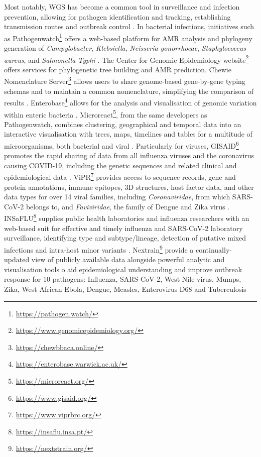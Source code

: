 Most notably, WGS has become a common tool in surveillance and infection prevention, allowing for pathogen identification and tracking, establishing transmission routes and outbreak control \citep{lo_genomics_2020}. In bacterial infections, initiatives such as Pathogenwatch\footnote{\url{https://pathogen.watch/}} offers a web-based platform for AMR analysis and phylogeny generation of \textit{Campylobacter}, \textit{Klebsiella}, \textit{Neisseria gonorrhoeae}, \textit{Staphylococcus aureus}, and \textit{Salmonella Typhi} \citep{afolayan_overcoming_2021}. The Center for Genomic Epidemiology website\footnote{\url{https://www.genomicepidemiology.org/}} offers services for phylogenetic tree building and AMR prediction. Chewie Nomenclature Server\footnote{\url{https://chewbbaca.online/}} allows users to share genome-based gene-by-gene typing schemas and to maintain a common nomenclature, simplifying the comparison of results \citep{mamede_chewie_2021}. Enterobase\footnote{\url{https://enterobase.warwick.ac.uk/}} allows for the analysis and visualisation of genomic variation within enteric bacteria \citep{zhou_enterobase_2020}. Microreact\footnote{\url{https://microreact.org/}}, from the same developers as Pathogenwatch, combines clustering, geographical and temporal data into an interactive visualisation with trees, maps, timelines and tables for a multitude of microorganisms, both bacterial and viral \citep{argimon_microreact_nodate}. Particularly for viruses, GISAID\footnote{\url{https://www.gisaid.org/}}  promotes the rapid sharing of data from all influenza viruses and the coronavirus causing COVID-19, including the genetic sequences and related clinical and epidemiological data \citep{shu_gisaid_2017}. ViPR\footnote{\url{https://www.viprbrc.org/}} provides access to sequence records, gene and protein annotations, immune epitopes, 3D structures, host factor data, and other data types for over 14 viral families, including \textit{Coronaviridae}, from which SARS-CoV-2 belongs to, and \textit{Faviviridae}, the family of Dengue and Zika virus \citep{pickett_virus_2012}. INSaFLU\footnote{\url{https://insaflu.insa.pt/}} supplies public health laboratories and influenza researchers with an web-based suit for effective and timely influenza and SARS-CoV-2 laboratory surveillance, identifying type and subtype/lineage, detection of putative mixed infections and intra-host minor variants \citep{borges_insaflu_2018}. Nextrain\footnote{\url{https://nextstrain.org/}} provide a continually-updated view of publicly available data alongside powerful analytic and visualisation tools o aid epidemiological understanding and improve outbreak response for 10 pathogens: Influenza, SARS-CoV-2, West Nile virus, Mumps, Zika, West African Ebola, Dengue, Measles, Enterovirus D68 and Tuberculosis \citep{hadfield_nextstrain_2018}


